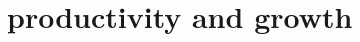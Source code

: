 \documentclass[pdflatex,12pt,a4paper]{report}
\begin{document}
\section{productivity and growth}


\clearpage
    \nocite{*}
    
    
\end{document}
